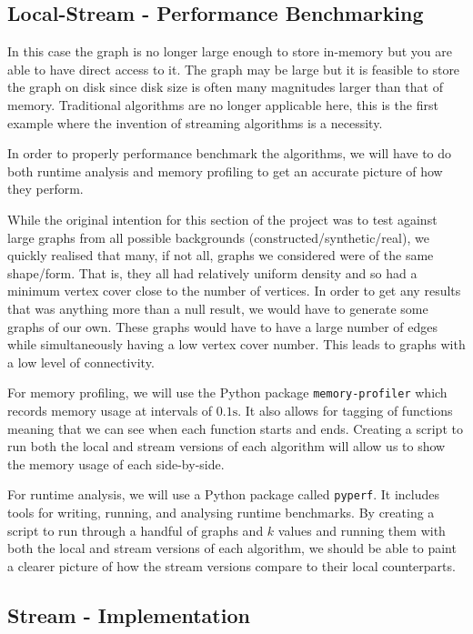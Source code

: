 \subsection{Local-Stream - Performance Benchmarking}

In this case the graph is no longer large enough to store in-memory but you are
able to have direct access to it. The graph may be large but it is feasible to
store the graph on disk since disk size is often many magnitudes larger than
that of memory. Traditional algorithms are no longer applicable here, this is
the first example where the invention of streaming algorithms is a necessity.

In order to properly performance benchmark the algorithms, we will have to do
both runtime analysis and memory profiling to get an accurate picture of how
they perform.

While the original intention for this section of the project was to test
against large graphs from all possible backgrounds
(constructed/synthetic/real), we quickly realised that many, if not all, graphs
we considered were of the same shape/form. That is, they all had relatively
uniform density and so had a minimum vertex cover close to the number of
vertices. In order to get any results that was anything more than a null
result, we would have to generate some graphs of our own. These graphs would
have to have a large number of edges while simultaneously having a low vertex
cover number. This leads to graphs with a low level of connectivity.

For memory profiling, we will use the Python package \texttt{memory-profiler}
which records memory usage at intervals of \(0.1\text{s}\). It also allows for
tagging of functions meaning that we can see when each function starts and
ends. Creating a script to run both the local and stream versions of each
algorithm will allow us to show the memory usage of each side-by-side.

For runtime analysis, we will use a Python package called \texttt{pyperf}. It
includes tools for writing, running, and analysing runtime benchmarks. By
creating a script to run through a handful of graphs and \(k\) values and
running them with both the local and stream versions of each algorithm, we
should be able to paint a clearer picture of how the stream versions compare to
their local counterparts.

\subsection{Stream - Implementation}

